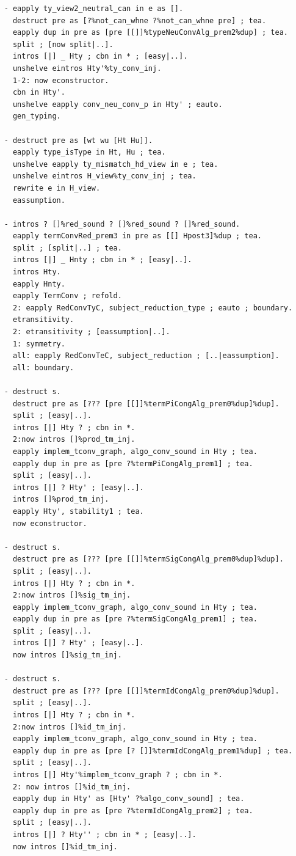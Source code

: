 \documentclass[10pt,a4paper]{amsart}
\begin{document}
\begin{lstlisting}
    - eapply ty_view2_neutral_can in e as [].
      destruct pre as [?%not_can_whne ?%not_can_whne pre] ; tea.
      eapply dup in pre as [pre [[]]%typeNeuConvAlg_prem2%dup] ; tea.
      split ; [now split|..].
      intros [|] _ Hty ; cbn in * ; [easy|..].
      unshelve eintros Hty'%ty_conv_inj.
      1-2: now econstructor.
      cbn in Hty'.
      unshelve eapply conv_neu_conv_p in Hty' ; eauto.
      gen_typing.

    - destruct pre as [wt wu [Ht Hu]].
      eapply type_isType in Ht, Hu ; tea.
      unshelve eapply ty_mismatch_hd_view in e ; tea.
      unshelve eintros H_view%ty_conv_inj ; tea.
      rewrite e in H_view.
      eassumption.

    - intros ? []%red_sound ? []%red_sound ? []%red_sound.
      eapply termConvRed_prem3 in pre as [[] Hpost3]%dup ; tea.
      split ; [split|..] ; tea.
      intros [|] _ Hnty ; cbn in * ; [easy|..].
      intros Hty.
      eapply Hnty.
      eapply TermConv ; refold.
      2: eapply RedConvTyC, subject_reduction_type ; eauto ; boundary.
      etransitivity.
      2: etransitivity ; [eassumption|..].
      1: symmetry.
      all: eapply RedConvTeC, subject_reduction ; [..|eassumption].
      all: boundary.

    - destruct s.
      destruct pre as [??? [pre [[]]%termPiCongAlg_prem0%dup]%dup].
      split ; [easy|..].
      intros [|] Hty ? ; cbn in *.
      2:now intros []%prod_tm_inj.
      eapply implem_tconv_graph, algo_conv_sound in Hty ; tea.
      eapply dup in pre as [pre ?%termPiCongAlg_prem1] ; tea.
      split ; [easy|..].
      intros [|] ? Hty' ; [easy|..].
      intros []%prod_tm_inj.
      eapply Hty', stability1 ; tea.
      now econstructor.
      
    - destruct s.
      destruct pre as [??? [pre [[]]%termSigCongAlg_prem0%dup]%dup].
      split ; [easy|..].
      intros [|] Hty ? ; cbn in *.
      2:now intros []%sig_tm_inj.
      eapply implem_tconv_graph, algo_conv_sound in Hty ; tea.
      eapply dup in pre as [pre ?%termSigCongAlg_prem1] ; tea.
      split ; [easy|..].
      intros [|] ? Hty' ; [easy|..].
      now intros []%sig_tm_inj.

    - destruct s.
      destruct pre as [??? [pre [[]]%termIdCongAlg_prem0%dup]%dup].
      split ; [easy|..].
      intros [|] Hty ? ; cbn in *.
      2:now intros []%id_tm_inj.
      eapply implem_tconv_graph, algo_conv_sound in Hty ; tea.
      eapply dup in pre as [pre [? []]%termIdCongAlg_prem1%dup] ; tea.
      split ; [easy|..].
      intros [|] Hty'%implem_tconv_graph ? ; cbn in *.
      2: now intros []%id_tm_inj.
      eapply dup in Hty' as [Hty' ?%algo_conv_sound] ; tea.
      eapply dup in pre as [pre ?%termIdCongAlg_prem2] ; tea.
      split ; [easy|..].
      intros [|] ? Hty'' ; cbn in * ; [easy|..].
      now intros []%id_tm_inj.


\end{lstlisting}
\end{document}
